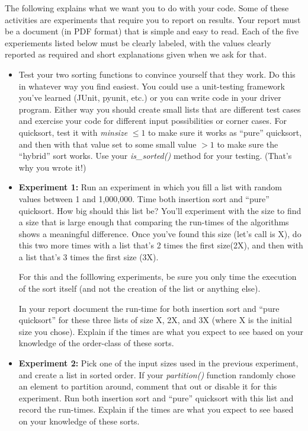 \documentclass[11pt]{article}
\begin{document}
The following explains what we want you to do with your code.  Some of these activities are experiments that require you to report on results.  Your report must be a document (in PDF format) that is simple and easy to read.  Each of the five experiements listed below must be clearly labeled, with the values clearly reported as required and short explanations given when we ask for that.
\begin{itemize}

\item Test your two sorting functions to convince yourself that they work. Do this in whatever way you find easiest. You could use a unit-testing framework you've learned (JUnit, pyunit, etc.) or you can write code in your driver program. Either way you should create small lists that are different test cases and exercise your code for different input possibilities or corner cases.  For quicksort, test it with {\em minsize} $\leq 1$ to make sure it works as ``pure'' quicksort, and then with that value set to some small value $>1$ to make sure the ``hybrid'' sort works.  Use your {\em is\_sorted()\/} method for your testing. (That's why you wrote it!)

\item {\bf Experiment 1:} Run an experiment in which you fill a list with random values between 1 and 1,000,000. Time both insertion sort and ``pure'' quicksort.  How big should this list be?  You'll experiment with the size to find a size that is large enough that comparing the run-times of the algorithms shows a meaningful difference.  Once you've found this size (let's call is X), do this two more times with a list that's 2 times the first size(2X), and then with a list that's 3 times the first size (3X).

For this and the folllowing experiments, be sure you only time the execution of the sort itself (and not the creation of the list or anything else).

In your report document the run-time for both insertion sort and ``pure quicksort'' for these three lists of size X, 2X, and 3X (where X is the initial size you chose).  Explain if the times are what you expect to see based on your knowledge of the order-class of these sorts.

\item {\bf Experiment 2:} Pick one of the input sizes used in the previous experiment, and create a list in sorted order.  If your {\em partition()\/} function randomly chose an element to partition around, comment that out or disable it for this experiment.  Run both insertion sort and ``pure'' quicksort with this list and record the run-times. Explain if the times are what you expect to see based on your knowledge of these sorts.


\end{itemize}
\end{document}
